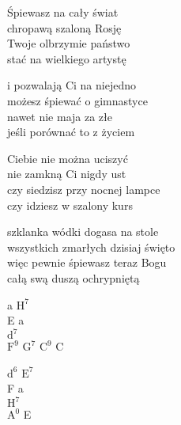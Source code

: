 \begin{text}
    Śpiewasz na cały świat\\
    chropawą szaloną Rosję\\
    Twoje olbrzymie państwo\\
    stać na wielkiego artystę

    i pozwalają Ci na niejedno\\
    możesz śpiewać o gimnastyce\\
    nawet nie maja za złe\\
    jeśli porównać to z życiem

    Ciebie nie można uciszyć\\
    nie zamkną Ci nigdy ust\\
    czy siedzisz przy nocnej lampce\\
    czy idziesz w szalony kurs

    szklanka wódki dogasa na stole\\
    wszystkich zmarłych dzisiaj święto\\
    więc pewnie śpiewasz teraz Bogu\\
    całą swą duszą ochrypniętą
\end{text}
\begin{chord}
    a $\mathrm{H^{7}}$\\
    E a\\
    $\mathrm{d^{7}}$\\
    $\mathrm{F^{9}}$ $\mathrm{G^{7}}$ $\mathrm{C^{9}}$ C

    $\mathrm{d^{6}}$ $\mathrm{E^{7}}$\\
    F a\\
    $\mathrm{H^{7}}$\\
    $\mathrm{A^{0}}$ E
\end{chord}
